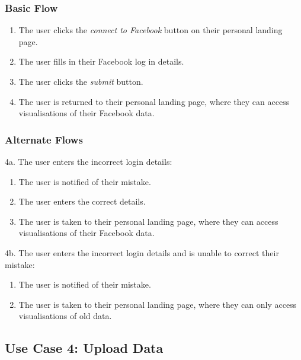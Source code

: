 \documentclass[12pt,onecolumn]{article}
\begin{document}
		\subsubsection{Basic Flow}

		\begin{enumerate}
			\item The user clicks the \emph{connect to Facebook} button on their personal landing page.

			\item The user fills in their Facebook log in details.

			\item The user clicks the \emph{submit} button.

			\item The user is returned to their personal landing page, where they can access visualisations of their Facebook data.		

		\end{enumerate}

		\subsubsection{Alternate Flows}

		4a. The user enters the incorrect login details:

		\begin{enumerate}
			\item The user is notified of their mistake.

			\item The user enters the correct details.

			\item The user is taken to their personal landing page, where they can access visualisations of their Facebook data.
		\end{enumerate}

		4b. The user enters the incorrect login details and is unable to correct their mistake:

		\begin{enumerate}
			\item The user is notified of their mistake.

			\item The user is taken to their personal landing page, where they can only access visualisations of old data.
		\end{enumerate}

	\subsection{Use Case 4: Upload Data}
\end{document}
